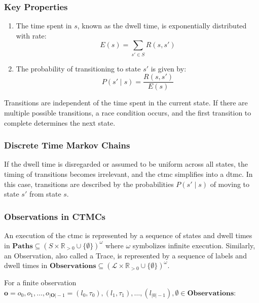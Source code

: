 \subsubsection{Key Properties}

\begin{enumerate}
    \item The time spent in $s$, known as the dwell time, is exponentially distributed with rate:
    \begin{equation}
        E(s) = \sum_{s' \in S} R(s, s')\label{eq:exitrate} %
    \end{equation}
    \item The probability of transitioning to state $s'$ is given by:
    \begin{equation}
        P(s' \mid s) = \frac{R(s, s')}{E(s)}\label{eq:transition-probability}
    \end{equation}
\end{enumerate}


Transitions are independent of the time spent in the current state.
If there are multiple possible transitions, a race condition occurs, and the first transition to complete determines the next state.


\subsubsection{Discrete Time Markov Chains}
If the dwell time is disregarded or assumed to be uniform across all states, the timing of transitions becomes irrelevant, and the \gls{ctmc} simplifies into a \gls{dtmc}.
In this case, transitions are described by the probabilities $P(s' \mid s)$ of moving to state $s'$ from state $s$.

\subsubsection{Observations in CTMCs}
An execution of the \gls{ctmc} is represented by a sequence of states and dwell times in $\textbf{Paths} \subseteq (S \times \mathbb{R}_{>0} \cup \{\emptyset\})^{\omega}$ where $\omega$ symbolizes infinite execution.
Similarly, an Observation, also called a Trace, is represented by a sequence of labels and dwell times in $\textbf{Observations} \subseteq (\mathcal{L} \times \mathbb{R}_{>0} \cup \{\emptyset\})^{\omega}$.

For a finite observation $\textbf{o} = o_0, o_1, \dots, o_{|\textbf{O}|-1} = (l_0,\tau_0),(l_1,\tau_1),\dots,(l_{|0|-1}), \emptyset \in \textbf{Observations}$:

